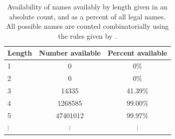 \begin{table}
\begin{tabular}{l | c | c }
Length & Number available & Percent available \\ \hline
1           & 0                & 0\%  \\
2           & 0                & 0\% \\
3           & 14335            & 41.39\% \\
4           & 1268585          & 99.00\% \\
5           & 47401012         & 99.97\% \\
$\vdots$    & $\vdots$         & $\vdots$
\end{tabular}
\caption{Availability of names availably by length given in an absolute count, and as a percent of all legal names. All possible names are counted combinatorially using the rules given by \cite{bitdnsspec}.}
\label{table:names_available}
\end{table}
